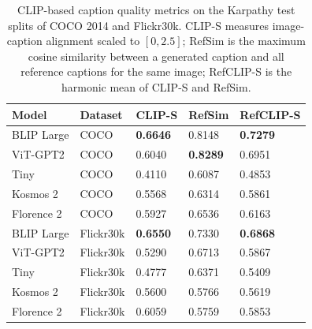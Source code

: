 \begin{table}[ht]
	\centering
	\caption{CLIP-based caption quality metrics on the Karpathy test 
		splits of COCO 2014 and Flickr30k. CLIP-S measures 
		image-caption alignment scaled to $[0, 2.5]$; RefSim is the 
		maximum cosine similarity between a generated caption and all 
		reference captions for the same image; RefCLIP-S is the harmonic 
		mean of CLIP-S and RefSim.}
	\label{tab:caption_quality_clip}
	\begin{tabular}{lllll}
		\hline
		\textbf{Model} & \textbf{Dataset} & \textbf{CLIP-S} & 
		\textbf{RefSim} & \textbf{RefCLIP-S} \\
		\hline
		BLIP Large   & COCO      & \textbf{0.6646} & 0.8148          & \textbf{0.7279} \\
		ViT-GPT2     & COCO      & 0.6040          & \textbf{0.8289} & 0.6951 \\
		Tiny         & COCO      & 0.4110          & 0.6087          & 0.4853 \\
		Kosmos 2     & COCO      & 0.5568          & 0.6314          & 0.5861 \\
		Florence 2   & COCO      & 0.5927          & 0.6536          & 0.6163 \\
		\hline
		BLIP Large   & Flickr30k & \textbf{0.6550} & 0.7330          & \textbf{0.6868} \\
		ViT-GPT2     & Flickr30k & 0.5290          & 0.6713          & 0.5867 \\
		Tiny         & Flickr30k & 0.4777          & 0.6371          & 0.5409 \\
		Kosmos 2     & Flickr30k & 0.5600          & 0.5766          & 0.5619 \\
		Florence 2   & Flickr30k & 0.6059          & 0.5759          & 0.5853 \\
		\hline
	\end{tabular}
\end{table}

